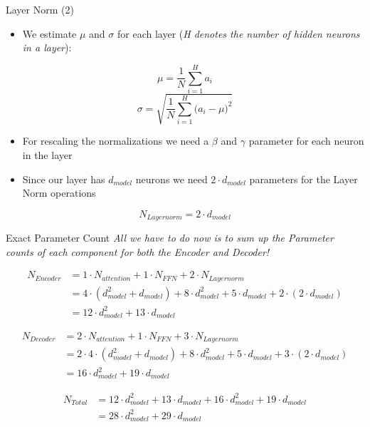 \documentclass[11pt,compress,t,notes=noshow, xcolor=table]{beamer}
\begin{document}

\begin{frame}{Layer Norm (2)}

\begin{itemize}
    \item We estimate $\mu$ and $\sigma$ for each layer (\textit{H denotes the number of hidden neurons in a layer}):
\end{itemize}
$$\mu = \frac{1}{N} \sum^{H}_{i=1}a_{i}$$
$$\sigma = \sqrt{\frac{1}{N} \sum^{H}_{i=1}{(a_{i}-\mu})^2}$$

\begin{itemize}
    \item For rescaling the normalizations we need a $\beta$ and $\gamma$ parameter for each neuron in the layer
    \item Since our layer has $d_{model}$ neurons we need $2\cdot d_{model}$ parameters for the Layer Norm operations
\end{itemize}

$$N_{Layernorm} = 2\cdot d_{model}$$
    
\end{frame}

\begin{frame}{Exact Parameter Count}
\textit{All we have to do now is to sum up the Parameter counts of each component for both the Encoder and Decoder!}

\begin{align*}
N_{Encoder} &= 1\cdot N_{attention} + 1\cdot N_{FFN} + 2\cdot N_{Layernorm} \\
&= 4\cdot(d_{model}^2 + d_{model}) + 8\cdot d_{model}^2 + 5\cdot d_{model} + 2\cdot(2\cdot d_{model}) \\
&= 12\cdot d_{model}^2 + 13 \cdot d_{model}
\end{align*}

\vspace{-.5cm}

\begin{align*}
N_{Decoder} &= 2\cdot N_{attention} + 1\cdot N_{FFN} + 3\cdot N_{Layernorm}\\
&= 2\cdot 4\cdot (d_{model}^2 + d_{model}) + 8\cdot d_{model}^2 + 5\cdot d_{model} + 3\cdot (2\cdot d_{model}) \\
&= 16\cdot d_{model}^2 + 19\cdot d_{model}
\end{align*}

\vspace{-.5cm}

\begin{align*}
N_{Total} &= 12\cdot d_{model}^2 + 13\cdot d_{model} + 16\cdot d_{model}^2 + 19\cdot d_{model} \\
&= 28\cdot d_{model}^2 + 29\cdot d_{model}
\end{align*}


\end{frame}
\end{document}
